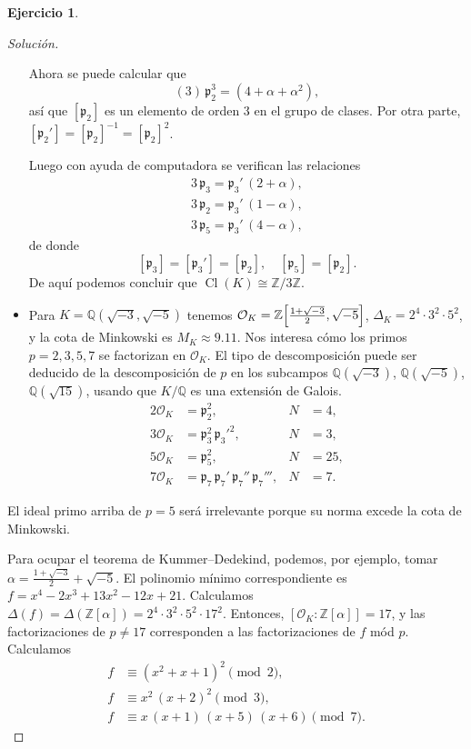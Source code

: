 \documentclass{article}
\newcounter{tarea}
\theoremstyle{definition}
\newtheorem{ejercicio}{Ejercicio}[tarea]
\newenvironment{solucion}{\begin{proof}[Solución]}{\end{proof}}
\DeclareMathOperator{\Cl}{Cl}
\newcommand{\ZZ}{\mathbb{Z}}
\newcommand{\QQ}{\mathbb{Q}}
\renewcommand{\O}{\mathcal{O}}
\begin{document}
\begin{ejercicio}
\begin{solucion}
\begin{itemize}
      Ahora se puede calcular que
      $$(3)\,\mathfrak{p}_2^3 = (4 + \alpha + \alpha^2),$$
      así que $[\mathfrak{p}_2]$ es un elemento de orden $3$ en el grupo de
      clases. Por otra parte,
      $[\mathfrak{p}_2'] = [\mathfrak{p}_2]^{-1} = [\mathfrak{p}_2]^2$.

      Luego con ayuda de computadora se verifican las relaciones
      \begin{gather*}
        3\,\mathfrak{p}_3 = \mathfrak{p}_3'\,(2 + \alpha),\\
        3\,\mathfrak{p}_2 = \mathfrak{p}_3'\,(1 - \alpha),\\
        3\,\mathfrak{p}_5 = \mathfrak{p}_3'\,(4 - \alpha),
      \end{gather*}
      de donde
      \[ [\mathfrak{p}_3] = [\mathfrak{p}_3'] = [\mathfrak{p}_2], \quad
        [\mathfrak{p}_5] = [\mathfrak{p}_2]. \]
      De aquí podemos concluir que $\Cl (K) \cong \ZZ/3\ZZ$.

    \item Para $K = \QQ (\sqrt{-3}, \sqrt{-5})$ tenemos
      $\O_K = \ZZ \Bigl[\frac{1+\sqrt{-3}}{2},\sqrt{-5}\Bigr]$,
      $\Delta_K = 2^4\cdot 3^2\cdot 5^2$, y la cota de Minkowski es
      $M_K \approx 9.11$. Nos interesa cómo los primos $p = 2,3,5,7$ se
      factorizan en $\O_K$. El tipo de descomposición puede ser deducido
      de la descomposición de $p$ en los subcampos $\QQ (\sqrt{-3})$,
      $\QQ (\sqrt{-5})$, $\QQ (\sqrt{15})$, usando que $K/\QQ$ es una extensión
      de Galois.
      \begin{align*}
        2\O_K & = \mathfrak{p}_2^2, & N & = 4, \\
        3\O_K & = \mathfrak{p}_3^2\,\mathfrak{p}_3'^2, & N & = 3, \\
        5\O_K & = \mathfrak{p}_5^2, & N & = 25, \\
        7\O_K & = \mathfrak{p}_7\,\mathfrak{p}_7'\,\mathfrak{p}_7''\,\mathfrak{p}_7''', & N & = 7.
      \end{align*}
    \end{itemize}

    El ideal primo arriba de $p = 5$ será irrelevante porque su norma excede la
    cota de Minkowski.

    Para ocupar el teorema de Kummer--Dedekind, podemos, por ejemplo, tomar
    $\alpha = \frac{1+\sqrt{-3}}{2} + \sqrt{-5}$. El polinomio mínimo
    correspondiente es $f = x^4 - 2 x^3 + 13 x^2 - 12 x + 21$. Calculamos
    $\Delta (f) = \Delta (\ZZ [\alpha]) = 2^4\cdot 3^2\cdot 5^2\cdot 17^2$.
    Entonces, $[\O_K : \ZZ [\alpha]] = 17$, y las factorizaciones de $p \ne 17$
    corresponden a las factorizaciones de $f$ mód $p$. Calculamos
    \begin{align*}
      f & \equiv (x^2 + x + 1)^2 \pmod{2}, \\
      f & \equiv x^2\,(x+2)^2 \pmod{3}, \\
      f & \equiv x\,(x+1)\,(x+5)\,(x+6) \pmod{7}.
    \end{align*}


\end{solucion}
\end{ejercicio}
\end{document}

